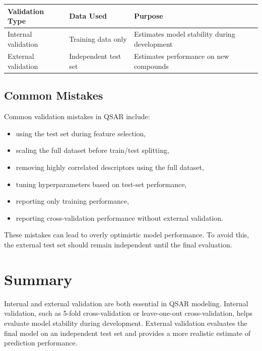 \documentclass[11pt]{report}
\newenvironment{Important note}{\begin{quote}\color{red}\textbf{Important note:} }{\end{quote}}
\begin{document}
\begin{center}
\begin{tabular}{p{}p{}p{}}
\toprule
\textbf{Validation Type} & \textbf{Data Used} & \textbf{Purpose} \\
\midrule
Internal validation & Training data only & Estimates model stability during development \\
External validation & Independent test set & Estimates performance on new compounds \\
\bottomrule
\end{tabular}
\end{center}

\subsection{Common Mistakes}

Common validation mistakes in QSAR include:

\begin{itemize}[leftmargin=*]
    \item using the test set during feature selection,
    \item scaling the full dataset before train/test splitting,
    \item removing highly correlated descriptors using the full dataset,
    \item tuning hyperparameters based on test-set performance,
    \item reporting only training performance,
    \item reporting cross-validation performance without external validation.
\end{itemize}

These mistakes can lead to overly optimistic model performance. To avoid this, the external test set should remain independent until the final evaluation.

\section{Summary}

Internal and external validation are both essential in QSAR modeling. Internal validation, such as 5-fold cross-validation or leave-one-out cross-validation, helps evaluate model stability during development. External validation evaluates the final model on an independent test set and provides a more realistic estimate of prediction performance.
\end{document}
